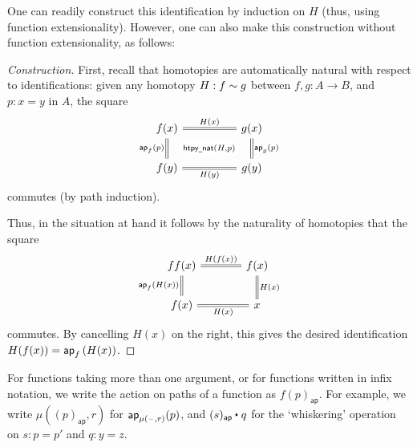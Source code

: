 One can readily construct this identification by induction on $H$ (thus, using function extensionality). However, one can also make this construction without function extensionality, as follows:

\begin{proof}[Construction]
First, recall that homotopies are automatically natural with respect to identifications: given any homotopy $H:f\sim g$ between $f,g:A\to B$, and $p:x=y$ in $A$, the square
\begin{equation*}
\begin{tikzcd}[column sep=huge]
f(x) \arrow[r,equals,"H(x)"] \arrow[d,equals,swap,"\mathsf{ap}_{f}(p)",""{name=A,right}] & g(x) \arrow[d,equals,"\ap{g}{p}",""{name=B,left}] \arrow[draw=none,from=A,to=B,"{\mathsf{htpy\usc{}nat}(H,p)}" description] \\
f(y) \arrow[r,equals,swap,"H(y)"] & g(y)
\end{tikzcd}
\end{equation*}
commutes (by path induction). 

Thus, in the situation at hand it follows by the naturality of homotopies that the square
\begin{equation*}
\begin{tikzcd}[column sep=large]
ff(x) \arrow[d,swap,equals,"\mathsf{ap}_{f}(H(x))"] \arrow[r,equals,"H(f(x))"] & f(x) \arrow[d,equals,"H(x)"] \\
f(x) \arrow[r,swap,equals,"H(x)"] & x
\end{tikzcd}
\end{equation*}
commutes. By cancelling $H(x)$ on the right, this gives the desired identification $H(f(x))=\mathsf{ap}_{f}\left({H(x)}\right)$.
\end{proof}

\begin{rmk}
For functions taking more than one argument, or for functions written in infix notation, we write the action on paths of a function as $f(p)_{\mathsf{ap}}$. For example, we write $\mu((p)_{\mathsf{ap}},r)$ for $\mathsf{ap}_{\mu(\mathord{\hspace{1pt}\text{--}\hspace{1pt}},r)}(p)$, and $\ct{(s)_{\mathsf{ap}}}{q}$ for the `whiskering' operation on $s:p=p'$ and $q:y=z$. 
\end{rmk}

